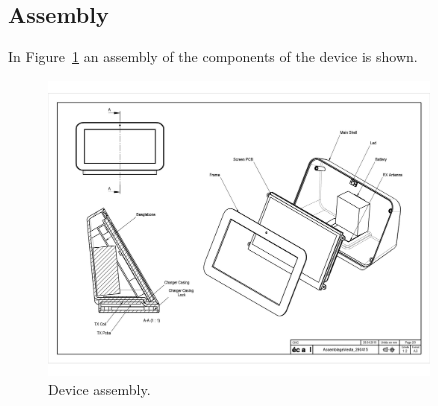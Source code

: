 \subsection{Assembly}
In Figure~\ref{fig:assembly} an assembly of the components of the device is shown.
\begin{figure}
    \centering
    \includegraphics[width=0.9\textwidth,keepaspectratio]{chap/designFig/AssemblageVestaB_290415}
    \caption{Device assembly.}
    \label{fig:assembly}
\end{figure}

